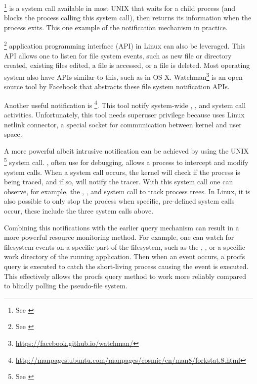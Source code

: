\footnote{See \href{https://linux.die.net/man/2/wait4}{}} is a system call available in most UNIX that waits for a child process (and blocks the process calling this system call), then returns its  information when the process exits.
This one example of the notification mechanism in practice.

\footnote{See \href{https://linux.die.net/man/7/inotify}{}} application programming interface (API) in Linux can also be leveraged.
This API allows one to listen for file system events, such as new file or directory created, existing files edited, a file is accessed, or a file is deleted.
Most operating system also have APIs similar to this, such as  in OS X. Watchman\footnote{\href{https://facebook.github.io/watchman/}{https://facebook.github.io/watchman/}} is an open source tool by Facebook that abstracts these file system notification APIs.

Another useful notification is \footnote{\href{http://manpages.ubuntu.com/manpages/cosmic/en/man8/forkstat.8.html}{http://manpages.ubuntu.com/manpages/cosmic/en/man8/forkstat.8.html}}.
This tool notify system-wide , , and  system call activities.
Unfortunately, this tool needs superuser privilege because uses Linux netlink connector, a special socket for communication between kernel and user space.

A more powerful albeit intrusive notification can be achieved by using the UNIX \footnote{See \href{https://linux.die.net/man/2/ptrace}{}} system call.
, often use for debugging, allows a process to intercept and modify system calls.
When a system call occurs, the kernel will check if the process is being traced, and if so, will notify the tracer.
With this system call one can observe, for example, the , , and  system call to track process trees.
In Linux, it is also possible to only stop the process when specific, pre-defined system calls occur, these include the three system calls above.

Combining this notifications with the earlier query mechanism can result in a more powerful resource monitoring method.
For example, one can watch for filesystem events on a specific part of the filesystem, such as the , , or a specific work directory of the running application. Then when an event occurs, a procfs query is executed to catch the short-living process causing the event is executed.
This effectively allows the procfs query method to work more reliably compared to blindly polling the pseudo-file system.

